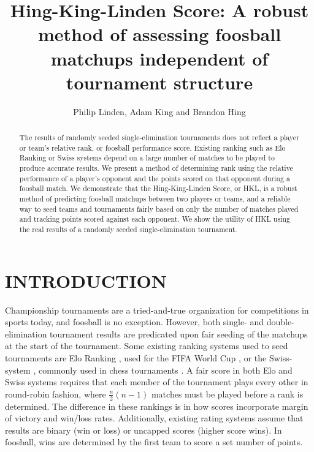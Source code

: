 \documentclass[letterpaper, 10 pt, conference]{ieeeconf}  %
\title{\LARGE \bf
Hing-King-Linden Score: 
A robust method of assessing foosball matchups independent of tournament structure
}
\author{Philip Linden, Adam King and Brandon Hing%
}
\begin{document}
\maketitle
\thispagestyle{empty}
\pagestyle{empty}


\begin{abstract}

The results of randomly seeded single-elimination tournaments does not reflect a
player or team's relative rank, or foosball performance score. Existing ranking
such as Elo Ranking or Swiss systems depend on a large number of matches to be
played to produce accurate results. We present a method of determining rank
using the relative performance of a player's opponent and the points scored on
that opponent during a foosball match. We demonstrate that the Hing-King-Linden
Score, or HKL, is a robust method of predicting foosball matchups between two
players or teams, and a reliable way to seed teams and tournaments fairly based
on only the number of matches played and tracking points scored against each
opponent. We show the utility of HKL using the real results of a randomly seeded
single-elimination tournament.

\end{abstract}


\section{INTRODUCTION}

Championship tournaments are a tried-and-true organization for competitions in
sports today, and foosball is no exception. However, both single- and
double-elimination tournament results are predicated upon fair seeding of the
matchups at the start of the tournament. Some existing ranking systems used to
seed tournaments are Elo Ranking \cite{elo}, used for the FIFA World Cup \cite{fifa}, or
the Swiss-system \cite{swiss}, commonly used in chess tournaments \cite{chess}. A fair score
in both Elo and Swiss systems requires that each member of the tournament plays
every other in round-robin fashion, where $\frac{n}{2}(n-1)$ matches must be
played before a rank is determined. The difference in these rankings is in how
scores incorporate margin of victory and win/loss rates. Additionally, existing
rating systems assume that results are binary (win or loss) or uncapped scores
(higher score wins). In foosball, wins are determined by the first team to score
a set number of points. 
\end{document}
